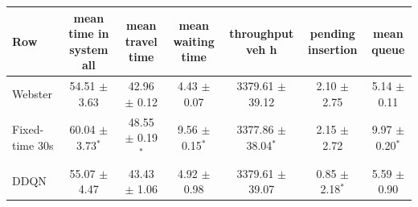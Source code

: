\begin{tabular}{lcccccc}
\toprule
Row & mean time in system all & mean travel time & mean waiting time & throughput veh h & pending insertion & mean queue \\
\midrule
Webster & 54.51 $\pm$ 3.63 & 42.96 $\pm$ 0.12 & 4.43 $\pm$ 0.07 & 3379.61 $\pm$ 39.12 & 2.10 $\pm$ 2.75 & 5.14 $\pm$ 0.11 \\
Fixed-time 30s & 60.04 $\pm$ 3.73$^{*}$ & 48.55 $\pm$ 0.19$^{*}$ & 9.56 $\pm$ 0.15$^{*}$ & 3377.86 $\pm$ 38.04$^{*}$ & 2.15 $\pm$ 2.72 & 9.97 $\pm$ 0.20$^{*}$ \\
DDQN & 55.07 $\pm$ 4.47 & 43.43 $\pm$ 1.06 & 4.92 $\pm$ 0.98 & 3379.61 $\pm$ 39.07 & 0.85 $\pm$ 2.18$^{*}$ & 5.59 $\pm$ 0.90 \\
\bottomrule
\end{tabular}
